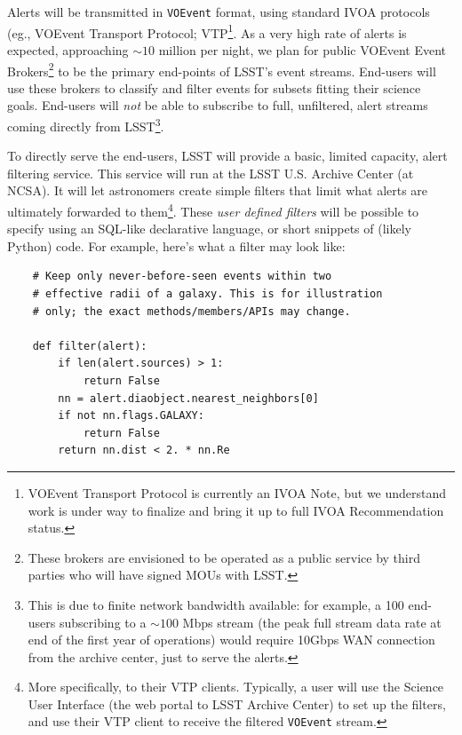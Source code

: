 \documentclass[12pt]{article}
\newcommand{\code}[1]{\texttt{#1}}
\newcommand{\VOEvent}{\code{VOEvent}\xspace}
\newcommand{\req}[1]{\marginpar{\tiny #1}}
\newcommand{\dmreq}[1]{\req{DMS-REQ-#1}}
\begin{document}
Alerts will be transmitted in \VOEvent format, using standard IVOA protocols\dmreq{0002} (eg., VOEvent Transport Protocol; VTP\footnote{VOEvent Transport Protocol is currently an IVOA Note, but we understand work is under way to finalize and bring it up to full IVOA Recommendation status.}. As a very high rate of alerts is expected, approaching $\sim 10$ million per night, we plan for public VOEvent Event Brokers\footnote{These brokers are envisioned to be operated as a public service by third parties who will have signed MOUs with LSST.} to be the primary end-points of LSST's event streams. End-users will use these brokers to classify and filter events for subsets fitting their science goals. End-users will \emph{not} be able to subscribe to full, unfiltered, alert streams coming directly from LSST\footnote{This is due to finite network bandwidth available: for example, a 100 end-users subscribing to a $\sim 100$ Mbps stream (the peak full stream data rate at end of the first year of operations) would require 10Gbps WAN connection from the archive center, just to serve the alerts.}.

To directly serve the end-users, LSST will provide a basic, limited capacity, alert filtering service.\dmreq{0342} This service will run at the LSST U.S. Archive Center (at NCSA). It will let astronomers create simple filters that limit what alerts are ultimately forwarded to them\footnote{More specifically, to their VTP clients. Typically, a user will use the Science User Interface (the web portal to LSST Archive Center) to set up the filters, and use their VTP client to receive the filtered \VOEvent stream.}. These \emph{user defined filters} will be possible to specify using an SQL-like declarative language, or short snippets of (likely Python) code. For example, here's what a filter may look like:
\begin{verbatim}
    # Keep only never-before-seen events within two
    # effective radii of a galaxy. This is for illustration
    # only; the exact methods/members/APIs may change.

    def filter(alert):
        if len(alert.sources) > 1:
            return False
        nn = alert.diaobject.nearest_neighbors[0]
        if not nn.flags.GALAXY:
            return False
        return nn.dist < 2. * nn.Re
\end{verbatim}
\end{document}
